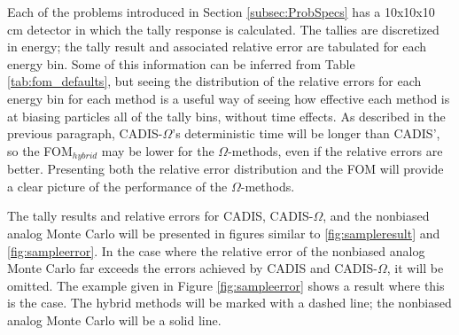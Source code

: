 Each of the problems introduced in Section \ref{subsec:ProbSpecs} has a
10x10x10 cm detector in which the tally response is calculated. The tallies are
discretized in energy; the tally result and associated relative error are
tabulated for each energy bin. Some of this information can be inferred from Table
\ref{tab:fom_defaults},
but seeing the distribution of the relative errors for each energy
bin for each method is a useful way of seeing how effective each method is at
biasing particles all of the tally bins,
without time effects. As described in the previous paragraph, CADIS-$\Omega$'s
deterministic time will be longer than CADIS', so the FOM$_{hybrid}$ may be
lower for the $\Omega$-methods, even if the relative errors are better.
Presenting both the relative error distribution and the FOM will provide a clear
picture of the performance of the $\Omega$-methods.

The tally results and relative errors for CADIS,
CADIS-$\Omega$, and the nonbiased analog Monte Carlo will be
presented in figures similar to
\ref{fig:sampleresult} and \ref{fig:sampleerror}.
In the case where the
relative error of the nonbiased analog Monte Carlo far exceeds the errors
achieved by CADIS and CADIS-$\Omega$, it will be omitted. The example given in
Figure \ref{fig:sampleerror} shows a result where this is the case.
The hybrid methods
will be marked with a dashed line; the nonbiased analog Monte Carlo will be a
solid line.

